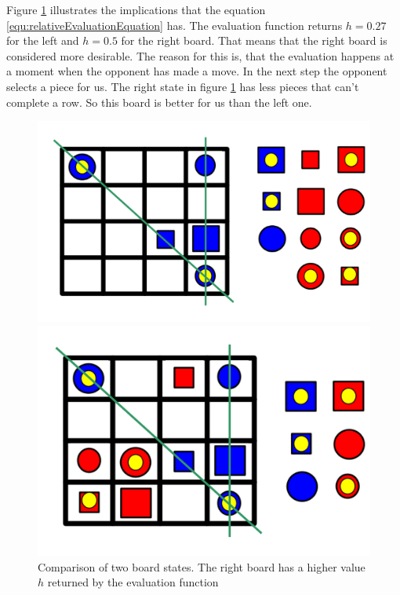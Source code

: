 Figure \ref{fig:relativeComparison} illustrates the implications that the equation \ref{equ:relativeEvaluationEquation} has. The evaluation function returns $h = 0.27$ for the left and $h = 0.5$ for the right board. That means that the right board is considered more desirable. The reason for this is, that the evaluation happens at a moment when the opponent has made a move. In the next step the opponent selects a piece for us. The right state in figure \ref{fig:relativeComparison} has less pieces that can't complete a row. So this board is better for us than the left one. 
\begin{figure}[h]
  \hspace*{-7mm}
  \begin{minipage}[b]{0.5\linewidth}
    \centering
    \includegraphics[height=0.2\textheight]{images/completingPiecesRelativeC}
  \end{minipage}
  \hspace{10mm}
  \begin{minipage}[b]{0.5\linewidth}
    \centering
    \includegraphics[height=0.2\textheight]{images/completingPiecesRelativeD}    
  \end{minipage}
  \caption{Comparison of two board states. The right board has a higher value $h$ returned by the evaluation function}
  \label{fig:relativeComparison}
\end{figure}
